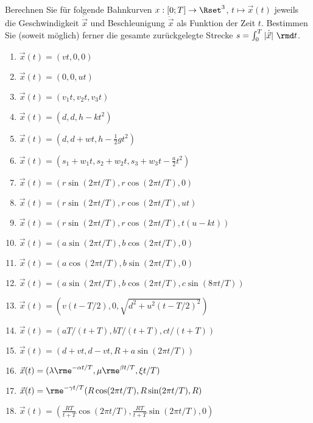 \documentclass[11pt,answers]{exam}
\begin{document}
\begin{questions}


% 

Berechnen Sie für folgende Bahnkurven $x:[0;T]\to\Rset^3$,
$t\mapsto\vec{x}(t)$ jeweils die Geschwindigkeit $\dot{\vec{x}}$ und
Beschleunigung $\ddot{\vec{x}}$ als Funktion der Zeit $t$.
Bestimmen Sie (soweit möglich) ferner die gesamte zurückgelegte Strecke
$s=\int_0^T |\dot{\vec{x}}|~\rmd t$.\\
\parbox{0.5\textwidth}{\begin{enumerate}
\item $\vec{x}(t)=(vt,0,0)$
\item $\vec{x}(t)=(0,0,ut)$
\item $\vec{x}(t)=(v_1t,v_2t,v_3t)$
\item $\vec{x}(t)=(d,d,h-kt^2)$
\item $\vec{x}(t)=(d,d+wt,h-\frac{1}{2}gt^2)$
\item $\vec{x}(t)=(s_1+w_1t,s_2+w_2t,s_3+w_3t-\frac{a}{2}t^2)$
\item $\vec{x}(t)=(r\sin(2\pi t/T),r\cos(2\pi t/T),0)$
\item $\vec{x}(t)=(r\sin(2\pi t/T),r\cos(2\pi t/T),ut)$
\item $\vec{x}(t)=(r\sin(2\pi t/T),r\cos(2\pi t/T),t(u-kt))$
\end{enumerate}}\parbox{0.5\textwidth}{\begin{enumerate}\setcounter{enumi}{9}
\item $\vec{x}(t)=(a\sin(2\pi t/T),b\cos(2\pi t/T),0)$
\item $\vec{x}(t)=(a\cos(2\pi t/T),b\sin(2\pi t/T),0)$
\item $\vec{x}(t)=(a\sin(2\pi t/T),b\cos(2\pi t/T),c\sin(8\pi t/T))$
\item $\vec{x}(t)=(v(t-T/2),0,\sqrt{d^2+u^2(t-T/2)^2})$
\item $\vec{x}(t)=(aT/(t+T),bT/(t+T),ct/(t+T))$
\item $\vec{x}(t)=(d+vt,d-vt,R+a\sin(2\pi t/T))$
\item $\vec{x}(t)=(\lambda\rme^{-\alpha t/T},\mu\rme^{\beta t/T},\xi t/T)$
\item $\vec{x}(t)=\rme^{-\gamma t/T}(R\cos(2\pi t/T),R\sin(2\pi t/T),R)$
\item $\vec{x}(t)=(\frac{RT}{t+T}\cos(2\pi t/T),\frac{RT}{t+T}\sin(2\pi t/T),0)$

\end{enumerate}}
\end{questions}
\end{document}

